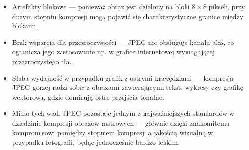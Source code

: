 \begin{itemize}
	\item Artefakty blokowe --- ponieważ obraz jest dzielony na bloki \(8 \times 8 \) pikseli, przy dużym stopniu kompresji mogą pojawić się charakterystyczne granice między blokami.
	
	\item Brak wsparcia dla przezroczystości --- JPEG nie obsługuje kanału alfa, co ogranicza jego zastosowanie np. w grafice internetowej wymagającej przezroczystego tła.
	
	\item Słaba wydajność w przypadku grafik z ostrymi krawędziami --- kompresja JPEG gorzej radzi sobie z obrazami zawierającymi tekst, wykresy czy grafikę wektorową, gdzie dominują ostre przejścia tonalne.
	
	\item Mimo tych wad, JPEG pozostaje jednym z najważniejszych standardów w dziedzinie kompresji obrazów rastrowych --- głównie dzięki znakomitemu kompromisowi pomiędzy stopniem kompresji a jakością wizualną w przypadku fotografii, będąc jednocześnie bardzo lekkim.
\end{itemize}

